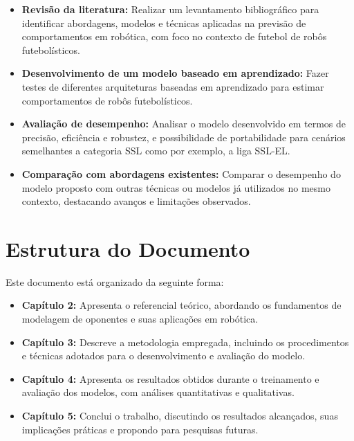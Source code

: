 \begin{itemize}
    \item \textbf{Revisão da literatura:} Realizar um levantamento bibliográfico para identificar abordagens, modelos e técnicas aplicadas na previsão de comportamentos em robótica, com foco no contexto de futebol de robôs futebolísticos.
    
    \item \textbf{Desenvolvimento de um modelo baseado em aprendizado:} Fazer testes de diferentes arquiteturas baseadas em aprendizado para estimar comportamentos de robôs futebolísticos.

    \item \textbf{Avaliação de desempenho:} Analisar o modelo desenvolvido em termos de precisão, eficiência e robustez, e possibilidade de portabilidade para cenários semelhantes a categoria SSL como por exemplo, a liga SSL-EL.

    \item \textbf{Comparação com abordagens existentes:} Comparar o desempenho do modelo proposto com outras técnicas ou modelos já utilizados no mesmo contexto, destacando avanços e limitações observados.

\end{itemize}

\section{Estrutura do Documento}

Este documento está organizado da seguinte forma:

\begin{itemize}
    \item \textbf{Capítulo 2:} Apresenta o referencial teórico, abordando os fundamentos de modelagem de oponentes e suas aplicações em robótica.
    \item \textbf{Capítulo 3:} Descreve a metodologia empregada, incluindo os procedimentos e técnicas adotados para o desenvolvimento e avaliação do modelo.
    \item \textbf{Capítulo 4:} Apresenta os resultados obtidos durante o treinamento e avaliação dos modelos, com análises quantitativas e qualitativas.
    \item \textbf{Capítulo 5:} Conclui o trabalho, discutindo os resultados alcançados, suas implicações práticas e propondo  para pesquisas futuras.
\end{itemize}


